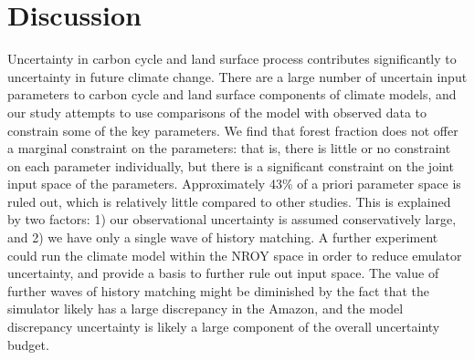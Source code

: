 \documentclass[esd, manuscript]{copernicus}
\begin{document}
 


\section{Discussion}\label{sec:discussion}
Uncertainty in carbon cycle and land surface process contributes significantly to uncertainty in future climate change. There are a large number of uncertain input parameters to carbon cycle and land surface components of climate models, and our study attempts to use comparisons of the model with observed data to constrain some of the key parameters. We find that forest fraction does not offer a marginal constraint on the parameters: that is, there is little or no constraint on each parameter individually, but there is a significant constraint on the joint input space of the parameters. Approximately 43\% of a priori parameter space is ruled out, which is relatively little compared to other studies. This is explained by two factors: 1) our observational uncertainty is assumed conservatively large, and 2) we have only a single wave of history matching. A further experiment could run the climate model within the NROY space in order to reduce emulator uncertainty, and provide a basis to further rule out input space. The value of further waves of history matching might be diminished by the fact that the simulator likely has a large discrepancy in the Amazon, and the model discrepancy uncertainty is likely a large component of the overall uncertainty budget.
\end{document}
